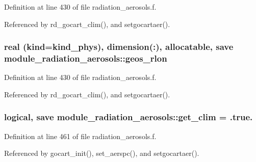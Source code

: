 Definition at line 430 of file radiation\+\_\+aerosols.\+f.



Referenced by rd\+\_\+gocart\+\_\+clim(), and setgocartaer().

\subsubsection[{\texorpdfstring{geos\+\_\+rlon}{geos_rlon}}]{\setlength{\rightskip}{0pt plus 5cm}real (kind=kind\+\_\+phys), dimension(\+:), allocatable, save module\+\_\+radiation\+\_\+aerosols\+::geos\+\_\+rlon\hspace{0.3cm}{\ttfamily [private]}}\hypertarget{group__module__radiation__aerosols_ga1a0e35ab33517e765898870b8b1ab1ad}{}\label{group__module__radiation__aerosols_ga1a0e35ab33517e765898870b8b1ab1ad}


Definition at line 430 of file radiation\+\_\+aerosols.\+f.



Referenced by rd\+\_\+gocart\+\_\+clim(), and setgocartaer().

\subsubsection[{\texorpdfstring{get\+\_\+clim}{get_clim}}]{\setlength{\rightskip}{0pt plus 5cm}logical, save module\+\_\+radiation\+\_\+aerosols\+::get\+\_\+clim = .true.\hspace{0.3cm}{\ttfamily [private]}}\hypertarget{group__module__radiation__aerosols_ga7fe1943010fe47c9d86ef4c993848459}{}\label{group__module__radiation__aerosols_ga7fe1943010fe47c9d86ef4c993848459}


Definition at line 461 of file radiation\+\_\+aerosols.\+f.



Referenced by gocart\+\_\+init(), set\+\_\+aerspc(), and setgocartaer().

